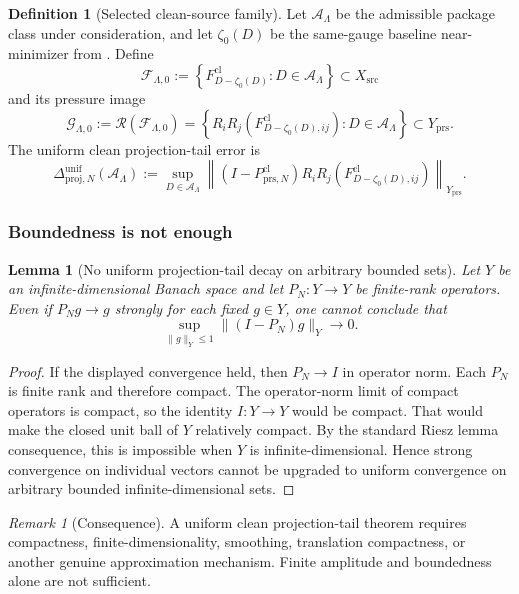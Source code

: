 \documentclass[11pt]{article}
\numberwithin{equation}{section}
\newtheorem{lemma}[lemma]{Lemma}
\theoremstyle{definition}
\newtheorem{definition}[definition]{Definition}
\theoremstyle{remark}
\newtheorem{remark}[remark]{Remark}
\newcommand{\prs}{\mathrm{prs}}
\newcommand{\proj}{\mathrm{proj}}
\newcommand{\src}{\mathrm{src}}
\newcommand{\cl}{\mathrm{cl}}
\begin{document}
\begin{definition}[Selected clean-source family]
\label{def:selected-clean-source-family}
Let \(\mathcal A_\Lambda\) be the admissible package class under
consideration, and let \(\zeta_0(D)\) be the same-gauge baseline
near-minimizer from .  Define
\[
    \mathcal F_{\Lambda,0}
    :=
    \left\{
        F^{\cl}_{D-\zeta_0(D)}
        :
        D\in\mathcal A_\Lambda
    \right\}
    \subset X_{\src}
\]
and its pressure image
\[
    \mathcal G_{\Lambda,0}
    :=
    \mathcal R(\mathcal F_{\Lambda,0})
    =
    \left\{
        R_iR_j(F^{\cl}_{D-\zeta_0(D),ij})
        :
        D\in\mathcal A_\Lambda
    \right\}
    \subset Y_{\prs} .
\]
The uniform clean projection-tail error is
\[
    \Delta^{\mathrm{unif}}_{\proj,N}(\mathcal A_\Lambda)
    :=
    \sup_{D\in\mathcal A_\Lambda}
    \left\|
        (I-P^{\cl}_{\prs,N})
        R_iR_j(F^{\cl}_{D-\zeta_0(D),ij})
    \right\|_{Y_{\prs}}.
\]
\end{definition}

\subsubsection{Boundedness is not enough}

\begin{lemma}[No uniform projection-tail decay on arbitrary bounded sets]
\label{lem:no-uniform-projection-without-compactness}
Let \(Y\) be an infinite-dimensional Banach space and let
\(P_N:Y\to Y\) be finite-rank operators.  Even if \(P_Ng\to g\) strongly for
each fixed \(g\in Y\), one cannot conclude that
\[
    \sup_{\|g\|_Y\le 1}\|(I-P_N)g\|_Y\to 0.
\]
\end{lemma}

\begin{proof}
If the displayed convergence held, then \(P_N\to I\) in operator norm.  Each
\(P_N\) is finite rank and therefore compact.  The operator-norm limit of
compact operators is compact, so the identity \(I:Y\to Y\) would be compact.
That would make the closed unit ball of \(Y\) relatively compact.  By the
standard Riesz lemma consequence, this is impossible when \(Y\) is
infinite-dimensional.  Hence strong convergence on individual vectors cannot
be upgraded to uniform convergence on arbitrary bounded infinite-dimensional
sets.
\end{proof}

\begin{remark}[Consequence]
A uniform clean projection-tail theorem requires compactness,
finite-dimensionality, smoothing, translation compactness, or another genuine
approximation mechanism.  Finite amplitude and boundedness alone are not
sufficient.
\end{remark}
\end{document}
